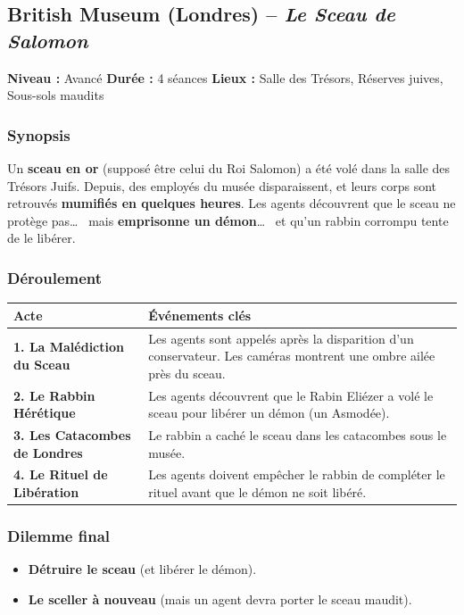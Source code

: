 \documentclass[10pt,a5paper,twoside]{book}
\begin{document}
\subsection{British Museum (Londres) -- \textit{Le Sceau de Salomon}}

\begin{shaded}
	\textbf{Niveau :} Avancé \quad
	\textbf{Durée :} 4 séances \quad
	\textbf{Lieux :} Salle des Trésors, Réserves juives, Sous-sols maudits
\end{shaded}

\subsubsection*{Synopsis}
Un \textbf{sceau en or} (supposé être celui du Roi Salomon) a été volé dans la salle des Trésors Juifs. Depuis, des employés du musée disparaissent, et leurs corps sont retrouvés \textbf{mumifiés en quelques heures}. Les agents découvrent que le sceau ne protège pas\ldots~  mais \textbf{emprisonne un démon}\ldots~  et qu'un rabbin corrompu tente de le libérer.

\subsubsection*{Déroulement}
\begin{center}
	\begin{tabular}{|P{3cm}|P{9cm}|}
	\hline
	\textbf{Acte} 							& \textbf{Événements clés} \\ \hline
	\textbf{1. La Malédiction du Sceau} 	& Les agents sont appelés après la disparition d'un conservateur. Les caméras montrent une ombre ailée près du sceau. \\ \hline
	\textbf{2. Le Rabbin Hérétique}			& Les agents découvrent que le Rabin Eliézer a volé le sceau pour libérer un démon (un Asmodée). \\ \hline
	\textbf{3. Les Catacombes de Londres} 	& Le rabbin a caché le sceau dans les catacombes sous le musée. \\ \hline
	\textbf{4. Le Rituel de Libération} 	& Les agents doivent empêcher le rabbin de compléter le rituel avant que le démon ne soit libéré. \\ \hline
	\end{tabular}
\end{center}

\subsubsection*{Dilemme final}
\begin{itemize}
	\item \textbf{Détruire le sceau} (et libérer le démon).
	\item \textbf{Le sceller à nouveau} (mais un agent devra porter le sceau maudit).
\end{itemize}
\end{document}

